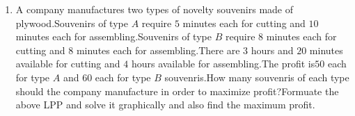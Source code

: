\documentclass[2pt,-letter paper]{article}
\begin{document}
\begin{enumerate}
\item A company manufactures two types of novelty souvenirs made of plywood.Souvenirs of type $A$ require $5$ minutes each for cutting and $10$ minutes each for assembling.Souvenirs of type $B$ require $8$ minutes each for cutting and $8$ minutes each for assembling.There are $3$ hours and $20$ minutes available for cutting and $4$ hours available for assembling.The profit is\rupee $50$ each for type $A$ and \rupee $60$ each for type $B$ souvenris.How many souvenris of each type should the company manufacture in order to maximize profit?Formuate the above LPP and solve it graphically and also find the maximum profit.
\end{enumerate}
\end{document}
